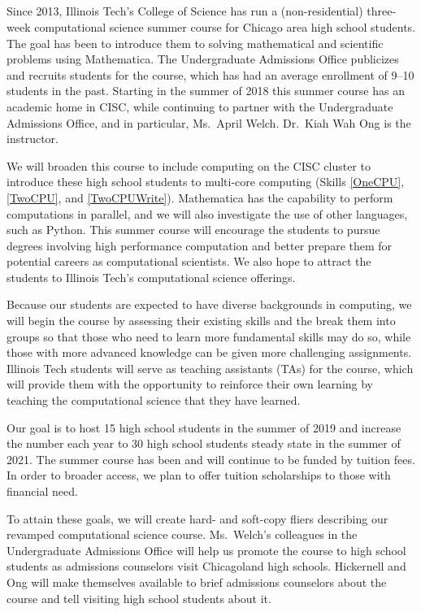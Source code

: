 \documentclass[11pt]{NSFamsart}
\begin{document}
\subsection{\CampName} \label{Camp} Since 2013, Illinois Tech's College of Science has run a (non-residential) three-week computational science summer course for Chicago area high school students.  The goal has been to introduce them to solving mathematical and scientific problems using Mathematica.  The Undergraduate Admissions Office publicizes and recruits students for the course, which has had an average enrollment of 9--10 students in the past.  Starting in the summer of 2018 this summer course has an academic home in CISC, while continuing to partner with the Undergraduate Admissions Office, and in particular, Ms.~April Welch.  Dr.~Kiah Wah Ong is the instructor.

We will broaden this course to include computing on the CISC cluster to introduce these high school students to multi-core computing (Skills \ref{OneCPU}, \ref{TwoCPU}, and \ref{TwoCPUWrite}).  Mathematica has the capability to perform computations in parallel, and we will also investigate the use of other languages, such as Python.  This summer course will encourage the students to pursue degrees involving high performance computation and better prepare them for potential careers as computational scientists.  We also hope to attract the students to Illinois Tech's computational science offerings.  

Because our students are expected to have diverse backgrounds in computing, we will begin the course by assessing their existing skills and the break them into groups so that those who need to learn more fundamental skills may do so, while those with more advanced knowledge can be given more challenging assignments.  Illinois Tech students will serve as teaching assistants (TAs) for the course, which will provide them with the opportunity to reinforce their own learning by teaching the computational science that they have learned. 

Our goal is to host 15 high school students in the summer of 2019 and increase the number each year to 30 high school students steady state in the summer of 2021.  The summer course has been and will continue to be funded by tuition fees.  In order to broader access, we plan to offer tuition scholarships to those with financial need.

To attain these goals, we will create hard- and soft-copy fliers describing our revamped computational science course. Ms.~Welch's colleagues in the Undergraduate Admissions Office will help us promote the course to high school students as admissions counselors visit Chicagoland high schools.  Hickernell and Ong will make themselves available to brief admissions counselors about the course and tell visiting high school students about it.
\end{document}
